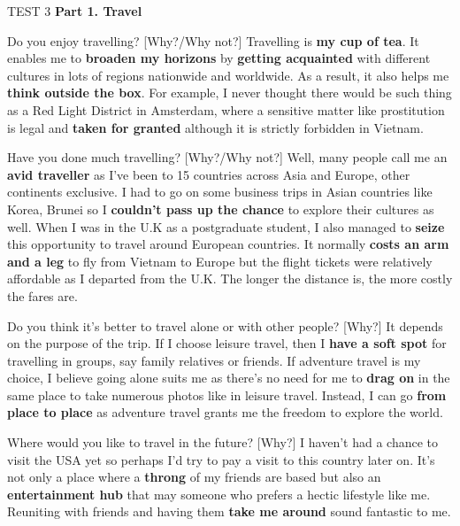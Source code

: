 \begin{glossarymc}[Cambridge 10]
    \begin{test}{TEST 3}
    \noindent
    \textbf{Part 1. Travel}
    \begin{qa}{Do you enjoy travelling? [Why?/Why not?]}
    Travelling is \textbf{my cup of tea}. It enables me to \textbf{broaden my horizons} by \textbf{getting acquainted} with different cultures in lots of regions nationwide and worldwide. As a result, it also helps me \textbf{think outside the box}. For example, I never thought there would be such thing as a Red Light District in Amsterdam, where a sensitive matter like prostitution is legal and \textbf{taken for granted} although it is strictly forbidden in Vietnam.
    \end{qa}

    \begin{qa}{Have you done much travelling? [Why?/Why not?]}
    Well, many people call me an \textbf{avid traveller} as I've been to 15 countries across Asia and Europe, other continents exclusive. I had to go on some business trips in Asian countries like Korea, Brunei so I \textbf{couldn't pass up the chance} to explore their cultures as well. When I was in the U.K as a postgraduate student, I also managed to \textbf{seize} this opportunity to travel around European countries. It normally \textbf{costs an arm and a leg} to fly from Vietnam to Europe but the flight tickets were relatively affordable as I departed from the U.K. The longer the distance is, the more costly the fares are.
    \end{qa}

    \begin{qa}{Do you think it's better to travel alone or with other people? [Why?]}
    It depends on the purpose of the trip. If I choose leisure travel, then I \textbf{have a soft spot} for travelling in groups, say family relatives or friends. If adventure travel is my choice, I believe going alone suits me as there's no need for me to \textbf{drag on} in the same place to take numerous photos like in leisure travel. Instead, I can go \textbf{from place to place} as adventure travel grants me the freedom to explore the world.
    \end{qa}

    \begin{qa}{Where would you like to travel in the future? [Why?]}
    I haven't had a chance to visit the USA yet so perhaps I'd try to pay a visit to this country later on. It's not only a place where a \textbf{throng} of my friends are based but also an \textbf{entertainment hub} that may someone who prefers a hectic lifestyle like me. Reuniting with friends and having them \textbf{take me around} sound fantastic to me.
    \end{qa}


\end{test}
\end{glossarymc}
